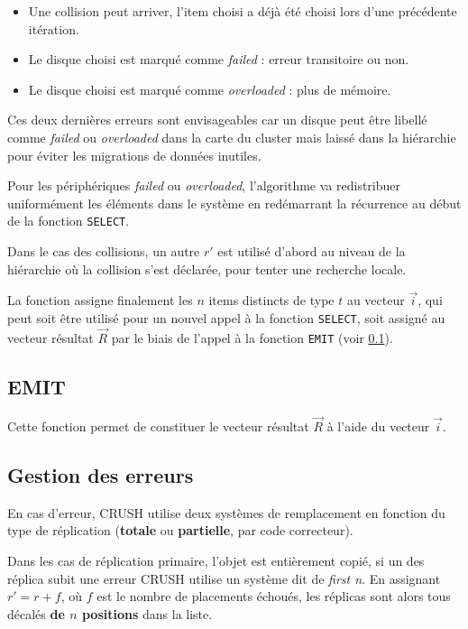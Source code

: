 \begin{itemize}
\item Une collision peut arriver, \eg l'item choisi a déjà été choisi lors d'une précédente itération.
\item Le disque choisi est marqué comme \textit{failed} : erreur transitoire ou non.
\item Le disque choisi est marqué comme \textit{overloaded} : plus de mémoire.
\end{itemize}

Ces deux dernières erreurs sont envisageables car un disque peut être libellé comme \textit{failed} ou \textit{overloaded} dans la carte du cluster mais laissé dans la hiérarchie pour éviter les migrations de données inutiles.

Pour les périphériques \textit{failed} ou \textit{overloaded}, l'algorithme va redistribuer uniformément les éléments dans le système en redémarrant la récurrence au début de la fonction \verb|SELECT|.%

Dans le cas des collisions, un autre $r'$ est utilisé d'abord au niveau de la hiérarchie où la collision s'est déclarée, pour tenter une recherche locale.%

La fonction assigne finalement les $n$ items distincts de type $t$ au vecteur $\vec{i}$, qui peut soit être utilisé pour un nouvel appel à la fonction \verb|SELECT|, soit assigné au vecteur résultat $\vec{R}$ par le biais de l'appel à la fonction \verb|EMIT| (voir \ref{chap3:emit}).

\subsection{EMIT}\label{chap3:emit}

Cette fonction permet de constituer le vecteur résultat $\vec{R}$ à l'aide du vecteur $\vec{i}$.

\subsection{Gestion des erreurs}

En cas d'erreur, CRUSH utilise deux systèmes de remplacement en fonction du type de réplication (\textbf{totale} ou \textbf{partielle}, \ie par code correcteur). 

Dans les cas de réplication primaire, \ie l'objet est entièrement copié, si un des réplica subit une erreur CRUSH utilise un système dit de \og{}\textit{first n}\fg{}. En assignant $r' = r + f$, où $f$ est le nombre de placements échoués, les réplicas sont alors tous décalés \textbf{de $n$ positions} dans la liste.

